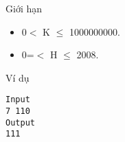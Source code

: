 Giới hạn  
\begin{itemize}
	\item     0$<$ K  $\le$ 1000000000.   
	\item     0=$<$ H  $\le$ 2008.   
\end{itemize}
   Ví dụ  
\begin{verbatim}
Input
7 110
Output
111
\end{verbatim}
